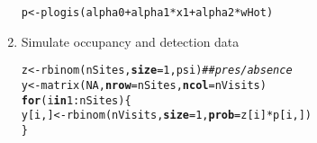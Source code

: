 \documentclass[color=usenames,dvipsnames]{beamer}\usepackage[]{graphicx}\usepackage[]{xcolor}
\makeatletter
\newcommand{\hlnum}[1]{\textcolor[rgb]{0.69,0.494,0}{#1}}%
\newcommand{\hlcom}[1]{\textcolor[rgb]{0.514,0.506,0.514}{\textit{#1}}}%
\newcommand{\hlopt}[1]{\textcolor[rgb]{0,0,0}{#1}}%
\newcommand{\hlstd}[1]{\textcolor[rgb]{0,0,0}{#1}}%
\newcommand{\hlkwa}[1]{\textcolor[rgb]{0,0,0}{\textbf{#1}}}%
\newcommand{\hlkwb}[1]{\textcolor[rgb]{0,0.341,0.682}{#1}}%
\newcommand{\hlkwc}[1]{\textcolor[rgb]{0,0,0}{\textbf{#1}}}%
\newcommand{\hlkwd}[1]{\textcolor[rgb]{0.004,0.004,0.506}{#1}}%
\newenvironment{kframe}{%
 \def\at@end@of@kframe{}%
 \ifinner\ifhmode%
  \def\at@end@of@kframe{\end{minipage}}%
  \begin{minipage}{\columnwidth}%
 \fi\fi%
 \def\FrameCommand##1{\hskip\@totalleftmargin \hskip-\fboxsep
 \colorbox{shadecolor}{##1}\hskip-\fboxsep
     \hskip-\linewidth \hskip-\@totalleftmargin \hskip\columnwidth}%
 \MakeFramed {\advance\hsize-\width
   \@totalleftmargin\z@ \linewidth\hsize
   \@setminipage}}%
 {\par\unskip\endMakeFramed%
 \at@end@of@kframe}
\newenvironment{knitrout}{}{} %
\makeatother
\begin{document}
\begin{frame}[fragile]
\begin{enumerate}[<+->]
\begin{knitrout}
\begin{kframe}
\begin{alltt}
\hlstd{p} \hlkwb{<-} \hlkwd{plogis}\hlstd{(alpha0} \hlopt{+} \hlstd{alpha1}\hlopt{*}\hlstd{x1} \hlopt{+} \hlstd{alpha2}\hlopt{*}\hlstd{wHot)}
\end{alltt}
\end{kframe}
\end{knitrout}
  \item Simulate occupancy and detection data
\begin{knitrout}\scriptsize
{}\color{fgcolor}\begin{kframe}
\begin{alltt}
\hlstd{z} \hlkwb{<-} \hlkwd{rbinom}\hlstd{(nSites,} \hlkwc{size}\hlstd{=}\hlnum{1}\hlstd{, psi)}            \hlcom{## pres/absence}
\hlstd{y} \hlkwb{<-} \hlkwd{matrix}\hlstd{(}\hlnum{NA}\hlstd{,} \hlkwc{nrow}\hlstd{=nSites,} \hlkwc{ncol}\hlstd{=nVisits)}
\hlkwa{for}\hlstd{(i} \hlkwa{in} \hlnum{1}\hlopt{:}\hlstd{nSites) \{}
    \hlstd{y[i,]} \hlkwb{<-} \hlkwd{rbinom}\hlstd{(nVisits,} \hlkwc{size}\hlstd{=}\hlnum{1}\hlstd{,} \hlkwc{prob}\hlstd{=z[i]}\hlopt{*}\hlstd{p[i,])}
\hlstd{\}}
\end{alltt}
\end{kframe}
\end{knitrout}
\end{enumerate}
\end{frame}
\end{document}
